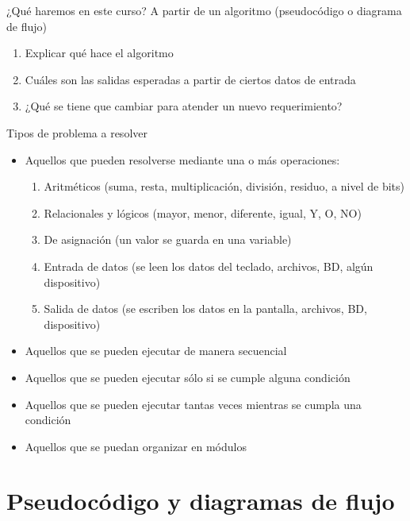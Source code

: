 \begin{frame}[c]{¿Qué haremos en este curso?}
  A partir de un algoritmo (pseudocódigo o diagrama de flujo)
  \begin{enumerate}
    \item Explicar qué hace el algoritmo
    \pausa
    \item Cuáles son las salidas esperadas a partir de ciertos datos de
      entrada
    \pausa
    \item ¿Qué se tiene que cambiar para atender un nuevo requerimiento?
  \end{enumerate}
\end{frame}

\begin{frame}[c]{Tipos de problema a resolver}
  \begin{itemize}
    \item Aquellos que pueden resolverse mediante una o más operaciones:
      \begin{enumerate}
        \item Aritméticos (suma, resta, multiplicación, división, residuo,
          a nivel de bits)
        \pausa
        \item Relacionales y lógicos (mayor, menor, diferente, igual, Y, O, NO)
        \pausa
        \item De asignación (un valor se guarda en una variable)
        \pausa
        \item Entrada de datos (se leen los datos del teclado, archivos, BD,
          algún dispositivo)
        \pausa
        \item Salida de datos (se escriben los datos en la pantalla, archivos,
          BD, dispositivo)
      \end{enumerate}
    \pausa
    \item Aquellos que se pueden ejecutar de manera secuencial
    \pausa
    \item Aquellos que se pueden ejecutar sólo si se cumple alguna condición
    \pausa
    \item Aquellos que se pueden ejecutar tantas veces mientras se cumpla una
      condición
    \pausa
    \item Aquellos que se puedan organizar en módulos
  \end{itemize}
\end{frame}


\section{Pseudocódigo y diagramas de flujo}

